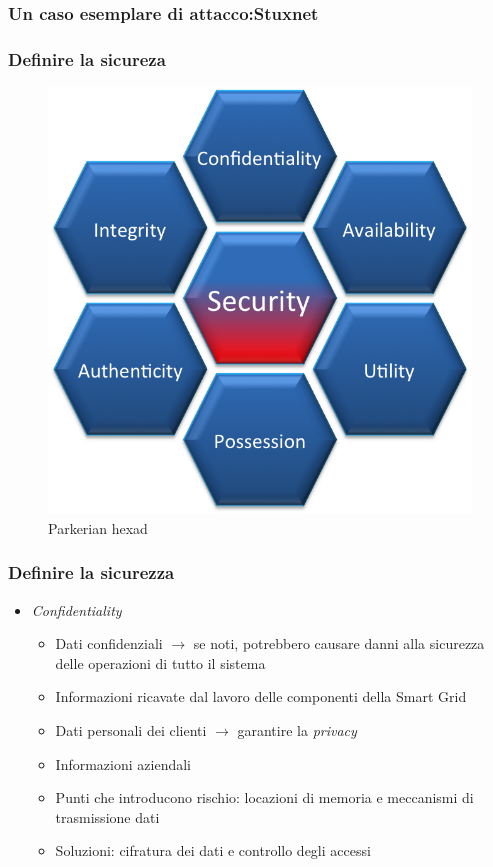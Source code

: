 \begin{frame}
  \frametitle{Un caso esemplare di attacco:Stuxnet}
\end{frame}

\begin{frame}
  \frametitle{Definire la sicureza}
  	\begin{figure}[h] 
		\includegraphics[scale=0.4]{imgs/hexad.png}
		\caption{Parkerian hexad}
	\end{figure}
\end{frame}

\begin{frame}
  \frametitle{Definire la sicurezza}
  \begin{itemize}[<+- | alert@+>]
  \item \textit{Confidentiality}
  	\begin{itemize}
  		\item Dati confidenziali $\rightarrow$ se noti, potrebbero causare danni alla sicurezza delle operazioni di tutto il sistema
  		\item Informazioni ricavate dal lavoro delle componenti della Smart Grid
  		\item Dati personali dei clienti $\rightarrow$ garantire la \textit{privacy}
  		\item Informazioni aziendali
  		\item Punti che introducono rischio: locazioni di memoria e meccanismi di trasmissione dati
  		\item Soluzioni: cifratura dei dati e controllo degli accessi
  	\end{itemize}
  \end{itemize}
\end{frame}

